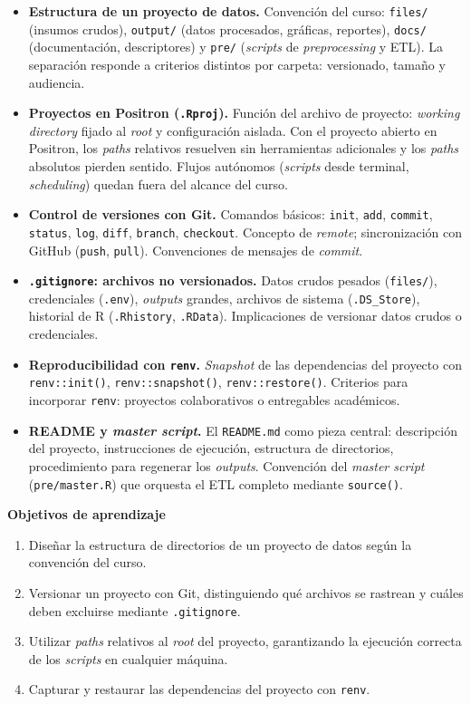 \documentclass[11pt,letterpaper]{article}
\begin{document}
\begin{itemize}[leftmargin=*, itemsep=2pt]
    \item \textbf{Estructura de un proyecto de datos.} Convención del curso: \texttt{files/} (insumos crudos), \texttt{output/} (datos procesados, gráficas, reportes), \texttt{docs/} (documentación, descriptores) y \texttt{pre/} (\textit{scripts} de \textit{preprocessing} y ETL). La separación responde a criterios distintos por carpeta: versionado, tamaño y audiencia.
    \item \textbf{Proyectos en Positron (\texttt{.Rproj}).} Función del archivo de proyecto: \textit{working directory} fijado al \textit{root} y configuración aislada. Con el proyecto abierto en Positron, los \textit{paths} relativos resuelven sin herramientas adicionales y los \textit{paths} absolutos pierden sentido. Flujos autónomos (\textit{scripts} desde terminal, \textit{scheduling}) quedan fuera del alcance del curso.
    \item \textbf{Control de versiones con Git.} Comandos básicos: \texttt{init}, \texttt{add}, \texttt{commit}, \texttt{status}, \texttt{log}, \texttt{diff}, \texttt{branch}, \texttt{checkout}. Concepto de \textit{remote}; sincronización con GitHub (\texttt{push}, \texttt{pull}). Convenciones de mensajes de \textit{commit}.
    \item \textbf{\texttt{.gitignore}: archivos no versionados.} Datos crudos pesados (\texttt{files/}), credenciales (\texttt{.env}), \textit{outputs} grandes, archivos de sistema (\texttt{.DS\_Store}), historial de R (\texttt{.Rhistory}, \texttt{.RData}). Implicaciones de versionar datos crudos o credenciales.
    \item \textbf{Reproducibilidad con \texttt{renv}.} \textit{Snapshot} de las dependencias del proyecto con \texttt{renv::init()}, \texttt{renv::snapshot()}, \texttt{renv::restore()}. Criterios para incorporar \texttt{renv}: proyectos colaborativos o entregables académicos.
    \item \textbf{README y \textit{master script}.} El \texttt{README.md} como pieza central: descripción del proyecto, instrucciones de ejecución, estructura de directorios, procedimiento para regenerar los \textit{outputs}. Convención del \textit{master script} (\texttt{pre/master.R}) que orquesta el ETL completo mediante \texttt{source()}.
\end{itemize}

\medskip
\noindent\textbf{Objetivos de aprendizaje}
\begin{enumerate}[leftmargin=*, itemsep=1pt]
    \item Diseñar la estructura de directorios de un proyecto de datos según la convención del curso.
    \item Versionar un proyecto con Git, distinguiendo qué archivos se rastrean y cuáles deben excluirse mediante \texttt{.gitignore}.
    \item Utilizar \textit{paths} relativos al \textit{root} del proyecto, garantizando la ejecución correcta de los \textit{scripts} en cualquier máquina.
    \item Capturar y restaurar las dependencias del proyecto con \texttt{renv}.
\end{enumerate}
\end{document}
